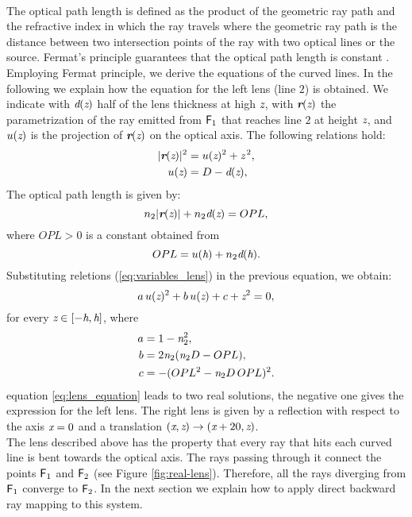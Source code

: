 \\ \indent The optical path length is defined as the product of the geometric ray path and the refractive index in which the ray travels where the geometric ray path is the distance between two intersection points of the ray with two optical lines or the source.
Fermat's principle guarantees that the optical path length is constant \cite{greivenkamp2004field}. Employing Fermat principle, we derive the equations of the curved lines. In the following we explain how the equation for the left lens (line $2$) is obtained. We indicate with $\textit{d}(\textit{z})$ half of the lens thickness at high $\textit{z}$, with $\textit{\textbf{r}}(\textit{z})$ the parametrization of the ray emitted from $\textsf{F}_1$ that reaches line $2$ at height $\textit{z}$, and $u(\textit{z})$ is the projection of $\textit{\textbf{r}}(\textit{z})$ on the optical axis. 
The following relations hold:
\begin{equation}\label{eq:variables_lens}
\begin{aligned}
|\textit{\textbf{r}}(\textit{z})|^{2} &= u(\textit{z})^2+\textit{z}^{\,2},\\
u(\textit{z}) &= D-\textit{d}(\textit{z}), 
\end{aligned}
\end{equation}
The optical path length is given by:
\begin{equation}\label{eq:path_length}
n_2|\textit{\textbf{r}}(\textit{z})|+n_2\textit{d}(\textit{z})=OPL,
\end{equation}  
where $OPL>0$ is a constant obtained from 
\begin{equation}\label{eq:path_length2}
OPL = u(\textit{h})+n_2\textit{d}(\textit{h}).
\end{equation} Substituting reletions (\ref{eq:variables_lens}) in the previous equation,
we obtain:
\begin{equation}\label{eq:lens_equation}
a\,u(\textit{z})^2+b\,u(\textit{z})+c+\textit{z}^2 = 0,
\end{equation}
for every $\textit{z}\in[-\textit{h}, \textit{h}]$, where 
\begin{equation}
\begin{aligned}
a & = 1-\textit{n}_2^2, \\
b & = 2\textit{n}_2(\textit{n}_2 D-OPL), \\
c & = -(OPL^2-\textit{n}_2 D\,OPL)^2. \\
\end{aligned}
\end{equation}
equation \ref{eq:lens_equation} leads to two real solutions, the negative one gives the expression for the left lens.
The right lens is given by a reflection with respect to the axis $\textit{x}=0$ and a translation $(\textit{x}, \textit{z})\rightarrow (\textit{x}+20, \textit{z})$.
\\ \indent The lens described above has the property that every ray that hits each curved line is bent towards the optical axis. The rays passing through it connect the points $\textsf{F}_1 $ and $\textsf{F}_2$ (see Figure \ref{fig:real-lens}). Therefore, all the rays diverging from $\textsf{F}_1$ converge to $\textsf{F}_2$. In the next section we explain how to apply direct backward ray mapping to this system.
